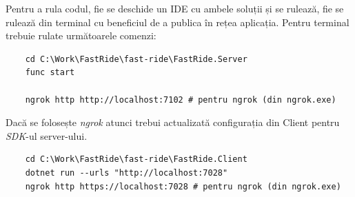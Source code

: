 Pentru a rula codul, fie se deschide un IDE cu ambele soluții și se rulează, fie se rulează din terminal
cu beneficiul de a publica în rețea aplicația. Pentru terminal trebuie rulate următoarele comenzi:

\begin{verbatim}
    cd C:\Work\FastRide\fast-ride\FastRide.Server
    func start

    ngrok http http://localhost:7102 # pentru ngrok (din ngrok.exe)
\end{verbatim}

Dacă se folosește \textit{ngrok} atunci trebui actualizată configurația din Client pentru \textit{SDK}-ul server-ului.
\begin{verbatim}
    cd C:\Work\FastRide\fast-ride\FastRide.Client
    dotnet run --urls "http://localhost:7028"
    ngrok http https://localhost:7028 # pentru ngrok (din ngrok.exe)
\end{verbatim}